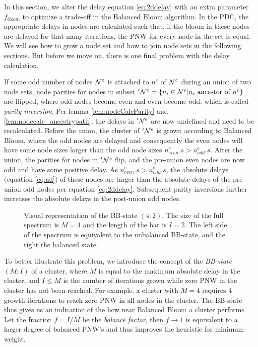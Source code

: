 In this section, we alter the delay equation \ref{eq:2ddelay} with an extra parameter $f_{bloom}$ to optimize a trade-off in the Balanced Bloom algorithm. In the PDC, the appropriate delays in nodes are calculated such that, if the bloom in these nodes are delayed for that many iterations, the PNW for every node in the set is equal. We will see how to grow a node set and how to join node sets in the following sections. But before we move on, there is one final problem with the delay calculation.

If some odd number of nodes $\mathcal{N}^o$ is attached to $n^e$ of $\mathcal{N}^e$ during an union of two node sets, node parities for nodes in subset $'\mathcal{N}^e= \{n_i \in \mathcal{N}^e | n_i \mbox{ ancestor of } n^e\}$ are flipped, where odd nodes become even and even become odd, which is called \emph{parity inversion}. Per lemma \ref{lem:nodeCalcParity} and \ref{lem:nodecalc_ancestrypath}, the delays in $'\mathcal{N}^e$ are now undefined and need to be recalculated. Before the union, the cluster of $'\mathcal{N}^e$ is grown according to Balanced Bloom, where the odd nodes are delayed and consequently the even nodes will have some node sizes larger than the odd node sizes $n^e_{even}.s > n^e_{odd}.s$.
After the union, the parities for nodes in $'\mathcal{N}^e$ flip, and the pre-union even nodes are now odd and have some positive delay. As $n^e_{even}.s > n^e_{odd}.s$, the absolute delays (equation \ref{eq:ad}) of these nodes are larger than the absolute delays of the pre-union odd nodes per equation \ref{eq:2ddelay}. Subsequent parity inversions further increases the absolute delays in the post-union odd nodes.
\begin{figure}[]
  \centering
  \caption{Visual representation of the BB-state $(4:2)$. The size of the full spectrum is $M=4$ and the length of the bar is $I=2$. The left side of the spectrum is equivalent to the unbalanced BB-state, and the right the balanced state.}\label{fig:bbstate}
\end{figure}
To better illustrate this problem, we introduce the concept of the \emph{BB-state} $(M:I)$ of a cluster, where $M$ is equal to the maximum absolute delay in the cluster, and $I\leq M$ is the number of iterations grown while zero PNW in the cluster has not been reached. For example, a cluster with $M=4$ requires 4 growth iterations to reach zero PNW in all nodes in the cluster. The BB-state thus gives us an indication of the how near Balanced Bloom a cluster performs. Let the fraction $f=I/M$ be the \emph{balance factor}, then $f \to 1$ is equivalent to a larger degree of balanced PNW's and thus improves the heuristic for minimum-weight.

